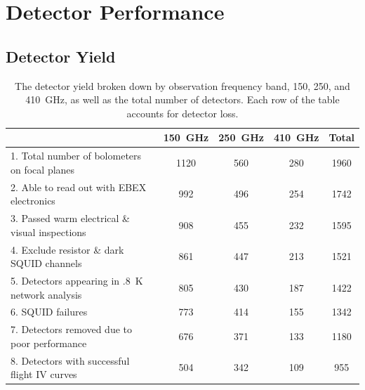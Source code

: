 \chapter{Detector Performance}
\label{detector_performance_chapter}

\section{Detector Yield}
\label{sec:yield}

\begin{table}[ht!]
\begin{center}
\begin{tabular}{l|c|c|c|c}
  & 150~GHz & 250~GHz & 410~GHz & Total \\
\hline 1. Total number of bolometers on focal planes & 1120 & 560 & 280 & 1960 \\
\hline 2. Able to read out with \ac{EBEX} electronics & 992 & 496 & 254 & 1742 \\
\hline 3. Passed warm electrical \& visual inspections & 908 & 455 & 232 & 1595 \\
\hline 4. Exclude resistor \& dark \ac{SQUID} channels & 861 & 447 & 213 & 1521 \\
\hline 5. Detectors appearing in .8~K network analysis & 805 & 430 & 187 & 1422 \\
\hline 6. \ac{SQUID} failures & 773 & 414 & 155 & 1342 \\
\hline 7. Detectors removed due to poor performance & 676 & 371 & 133 & 1180 \\
\hline 8. Detectors with successful flight IV curves & 504 & 342 & 109 & 955 \\
\hline
\end{tabular}
\end{center}
\caption{The detector yield broken down by observation frequency band, 150, 250, and 410~GHz, as well as the total number of detectors. Each row of the table accounts for detector loss.}
\label{yield_table}
\end{table}%



